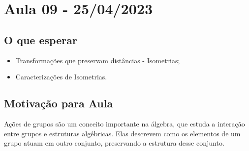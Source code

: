 \documentclass[Algebra/algebra_notes.tex]{subfiles}
\begin{document}
\section{Aula 09 - 25/04/2023}
\subsection{O que esperar}
\begin{itemize}
	\item Transformações que preservam distâncias - Isometrias;
	\item Caracterizações de Isometrias.
\end{itemize}

\subsection{Motivação para Aula}
Ações de grupos são um conceito importante na álgebra, que estuda a interação entre grupos e estruturas algébricas.
Elas descrevem como os elementos de um grupo atuam em outro conjunto, preservando a estrutura desse conjunto.
\end{document}
